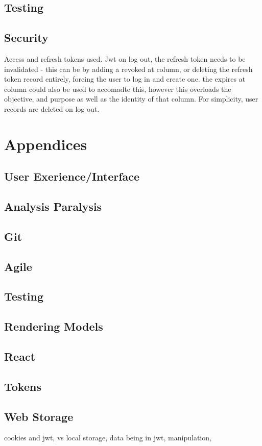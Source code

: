\documentclass{article}
\begin{document}
\subsection{Testing}

\subsection{Security}

Access and refresh tokens used. Jwt
on log out, the refresh token needs to be invalidated - this can be by adding a revoked at column, or deleting the refresh token record entirely, forcing the user to log in and create one.
the expires at column could also be used to accomadte this, however this overloads the objective, and purpose as well as the identity of that column.
For simplicity, user records are deleted on log out. 

\pagebreak
\section{Appendices}

\subsection{User Exerience/Interface}

\subsection{Analysis Paralysis}
\label{appendices:subsub:analysis-paralysis}

\subsection{Git}
\subsection{Agile}
\subsection{Testing}
\subsection{Rendering Models}
\subsection{React}
\subsection{Tokens}
\subsection{Web Storage}

cookies and jwt, vs local storage, data being in jwt, manipulation, 
\end{document}
